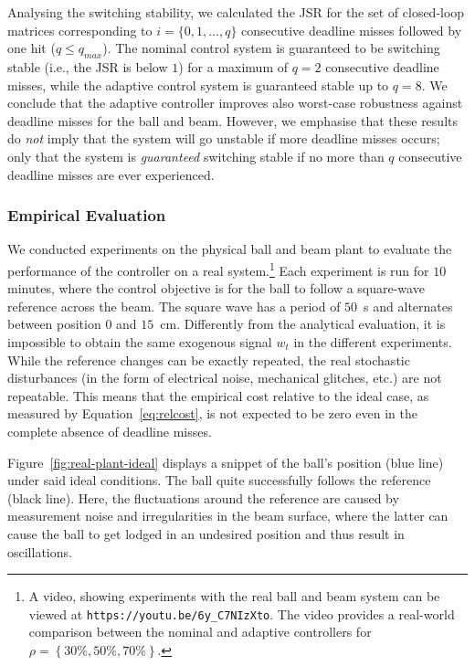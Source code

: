 Analysing the switching stability, we calculated the JSR for the set of closed-loop matrices corresponding to $i = \{0,1,\ldots,q\}$ consecutive deadline misses followed by one hit ($q \leq q_{max}$).
The nominal control system is guaranteed to be switching stable (i.e., the JSR is below $1$) for a maximum of $q=2$ consecutive deadline misses, while the adaptive control system is guaranteed stable up to $q=8$. 
We conclude that the adaptive controller improves also worst-case robustness against deadline misses for the ball and beam.
However, we emphasise that these results do \emph{not} imply that the system will go unstable if more deadline misses occurs; only that the system is \emph{guaranteed} switching stable if no more than $q$ consecutive deadline misses are ever experienced.

\subsubsection*{Empirical Evaluation}
We conducted experiments on the physical ball and beam plant to evaluate the performance of the controller on a real system.\footnote{A video, showing experiments with the real ball and beam system can be viewed at \texttt{https://youtu.be/6y\_C7NIzXto}. The video provides a real-world comparison between the nominal and adaptive controllers for $\rho = \left\{30\%, 50\%, 70\%\right\}$.}
Each experiment is run for $10$ minutes, where the control objective is for the ball to follow a square-wave reference across the beam.
The square wave has a period of $50$~s and alternates between position $0$ and $15$~cm.
Differently from the analytical evaluation, it is impossible to obtain the same exogenous signal $w_t$ in the different experiments.
While the reference changes can be exactly repeated, the real stochastic disturbances (in the form of electrical noise, mechanical glitches, etc.) are not repeatable.
This means that the empirical cost relative to the ideal case, as measured by Equation~\eqref{eq:relcost}, is not expected to be zero even in the complete absence of deadline misses.

Figure~\ref{fig:real-plant-ideal} displays a snippet of the ball's position (blue line) under said ideal conditions.
The ball quite successfully follows the reference (black line). 
Here, the fluctuations around the reference are caused by measurement noise and irregularities in the beam surface, where the latter can cause the ball to get lodged in an undesired position and thus result in oscillations.

